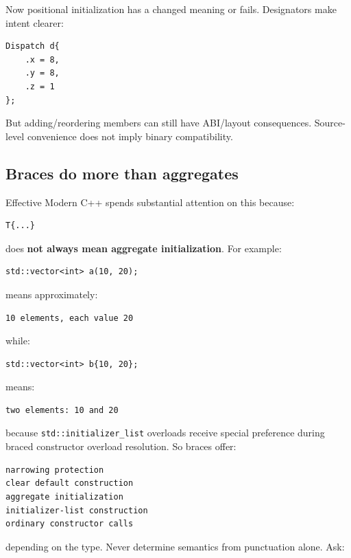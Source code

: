 Now positional initialization has a changed meaning or fails. Designators make intent clearer:

\begin{verbatim}
Dispatch d{
    .x = 8,
    .y = 8,
    .z = 1
};
\end{verbatim}

But adding/reordering members can still have ABI/layout consequences. Source-level convenience does not imply binary compatibility.

\subsection{Braces do more than aggregates}\label{05-engine-i-ch003-braces-do-more-than-aggregates}

Effective Modern C++ spends substantial attention on this because:

\begin{verbatim}
T{...}
\end{verbatim}

does \textbf{not always mean aggregate initialization}. For example:

\begin{verbatim}
std::vector<int> a(10, 20);
\end{verbatim}

means approximately:

\begin{verbatim}
10 elements, each value 20
\end{verbatim}

while:

\begin{verbatim}
std::vector<int> b{10, 20};
\end{verbatim}

means:

\begin{verbatim}
two elements: 10 and 20
\end{verbatim}

because \texttt{std::initializer\_list} overloads receive special preference during braced constructor overload resolution. So braces offer:

\begin{verbatim}
narrowing protection
clear default construction
aggregate initialization
initializer-list construction
ordinary constructor calls
\end{verbatim}

depending on the type. Never determine semantics from punctuation alone. Ask:


